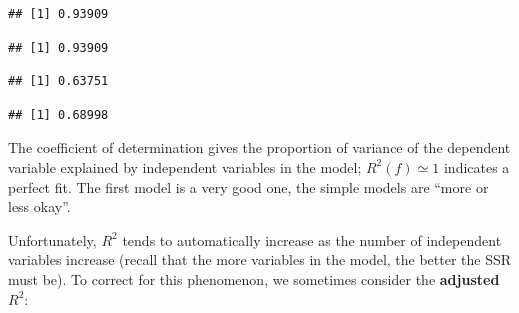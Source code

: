 \documentclass[10pt,b5paper,krantz1]{krantz}
\newenvironment{Shaded}{\begin{snugshade}}{\end{snugshade}}
\newcommand{\CommentTok}[1]{\textcolor[rgb]{0.37,0.37,0.37}{\textit{#1}}}
\newcommand{\DecValTok}[1]{\textcolor[rgb]{0.06,0.06,0.06}{#1}}
\newcommand{\KeywordTok}[1]{\textcolor[rgb]{0.27,0.27,0.27}{\textbf{#1}}}
\newcommand{\NormalTok}[1]{#1}
\newcommand{\OperatorTok}[1]{\textcolor[rgb]{0.43,0.43,0.43}{\textbf{#1}}}
\newcommand{\StringTok}[1]{\textcolor[rgb]{0.5,0.5,0.5}{#1}}
\begin{document}
\begin{verbatim}
## [1] 0.93909
\end{verbatim}

\begin{Shaded}
\end{Shaded}

\begin{verbatim}
## [1] 0.93909
\end{verbatim}

\begin{Shaded}
\end{Shaded}

\begin{verbatim}
## [1] 0.63751
\end{verbatim}

\begin{Shaded}
\end{Shaded}

\begin{verbatim}
## [1] 0.68998
\end{verbatim}

The coefficient of determination gives the proportion of variance of the
dependent variable explained by independent variables in the model;
\(R^2(f)\simeq 1\) indicates a perfect fit.
The first model is a very good one, the simple models are
``more or less okay''.

Unfortunately, \(R^2\) tends to automatically increase as the number of independent variables
increase (recall that the more variables in the model,
the better the SSR must be).
To correct for this phenomenon, we sometimes consider the \textbf{adjusted \(R^2\)}:
\end{document}
